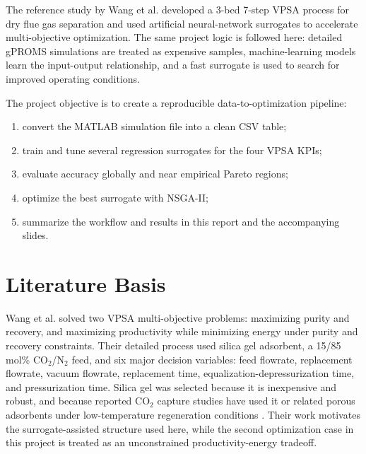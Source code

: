 \documentclass[a4paper,12pt]{article}
\begin{document}
The reference study by Wang et al. \cite{wang2022comparative} developed a 3-bed 7-step VPSA process for dry flue gas separation and used artificial neural-network surrogates to accelerate multi-objective optimization. The same project logic is followed here: detailed gPROMS simulations are treated as expensive samples, machine-learning models learn the input-output relationship, and a fast surrogate is used to search for improved operating conditions.

The project objective is to create a reproducible data-to-optimization pipeline:
\begin{enumerate}
    \item convert the MATLAB simulation file into a clean CSV table;
    \item train and tune several regression surrogates for the four VPSA KPIs;
    \item evaluate accuracy globally and near empirical Pareto regions;
    \item optimize the best surrogate with NSGA-II;
    \item summarize the workflow and results in this report and the accompanying slides.
\end{enumerate}

\section{Literature Basis}
Wang et al. \cite{wang2022comparative} solved two VPSA multi-objective problems: maximizing purity and recovery, and maximizing productivity while minimizing energy under purity and recovery constraints. Their detailed process used silica gel adsorbent, a 15/85 mol\% CO$_2$/N$_2$ feed, and six major decision variables: feed flowrate, replacement flowrate, vacuum flowrate, replacement time, equalization-depressurization time, and pressurization time. Silica gel was selected because it is inexpensive and robust, and because reported CO$_2$ capture studies have used it or related porous adsorbents under low-temperature regeneration conditions \cite{shen2012twostage,yan2016dryfluegas,wang2022comparative}. Their work motivates the surrogate-assisted structure used here, while the second optimization case in this project is treated as an unconstrained productivity-energy tradeoff.
\end{document}
